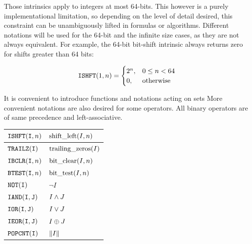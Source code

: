 \documentclass[./thesis.tex]{subfiles}
\begin{document}
      
Those intrinsics apply to integers at most 64-bits. This however is a purely implementational limitation, so depending on the level of detail desired, this constraint can be unambiguously lifted in formulas or algorithms. Different notations will be used for the 64-bit and the infinite size cases, as they are not always equivalent.
For example, the 64-bit bit-shift intrinsic always returns zero for shifts greater than 64 bits:

$$ \text{\texttt{ISHFT}}(1,n) =
\begin{cases}
2^{n}, & 0 \le n < 64 \\
0, & \text{otherwise}
\end{cases}
$$

It is convenient to introduce functions and notations acting on sets 
More convenient notations are also desired for some operators. All binary operators are of same precedence and left-associative.

\begin{table}[H]
	\begin{tabularx}{\textwidth}{X|X}
		\hline
		
		\hline
		\rule{0pt}{3ex}
		$\text{\texttt{ISHFT}}({\texttt{I}},n)$ & $\text{shift\_left}(I,n)$  \\ 
		
		\hline
		\rule{0pt}{3ex}
		$\text{\texttt{TRAILZ}}({\texttt{I}})$ & $\text{trailing\_zeros}(I)$  \\ 
		
		\hline
		\rule{0pt}{3ex}
		$\text{\texttt{IBCLR}}({\texttt{I}},n)$ & $\text{bit\_clear}(I,n)$  \\ 
		
		\hline
		\rule{0pt}{3ex}
		$\text{\texttt{BTEST}}({\texttt{I}},n)$ & $\text{bit\_test}(I,n)$  \\ 
		
		\hline
		\rule{0pt}{3ex}
		$\text{\texttt{NOT}}({\texttt{I}})$ & $\neg I $  \\ 
		
		\hline
		\rule{0pt}{3ex}
		$\text{\texttt{IAND}}({\texttt{I}},{{\texttt{J}}})$ & $I \wedge J$ \\
		
		\hline
		\rule{0pt}{3ex}
		$\text{\texttt{IOR}}({\texttt{I}},{{\texttt{J}}})$ & $I \vee J$ \\
		
		\hline
		\rule{0pt}{3ex}
		$\text{\texttt{IEOR}}({\texttt{I}},{{\texttt{J}}})$ & $I \oplus J$ \\
		
		\hline
		\rule{0pt}{3ex}
		$\text{\texttt{POPCNT}}({\texttt{I}})$ & $\norm{I}$ \\
		\hline
	\end{tabularx}
\end{table}
\end{document}
